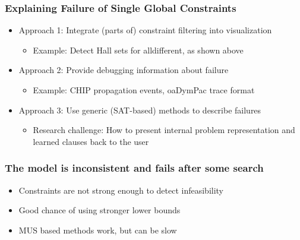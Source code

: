 \begin{frame}
\frametitle{Explaining Failure of Single Global Constraints \cite{DBLP:conf/discipl/SimonisABB00}}
\begin{itemize}
\item Approach 1: Integrate (parts of) constraint filtering into visualization
\begin{itemize}
\item Example: Detect Hall sets for alldifferent, as shown above
\end{itemize}
\item Approach 2: Provide debugging information about failure
\begin{itemize}
\item Example: CHIP propagation events, oaDymPac trace format
\end{itemize}
\item Approach 3: Use generic (SAT-based) methods to describe failures
\begin{itemize}
\item Research challenge: How to present internal problem representation and learned clauses back to the user 
\end{itemize}
\end{itemize}
\end{frame}

%
%
%


\begin{frame}
\frametitle{The model is inconsistent and fails after some search}
\begin{itemize}
\item Constraints are not strong enough to detect infeasibility
\item Good chance of using stronger lower bounds
\item MUS based methods work, but can be slow
\end{itemize}
\end{frame}

